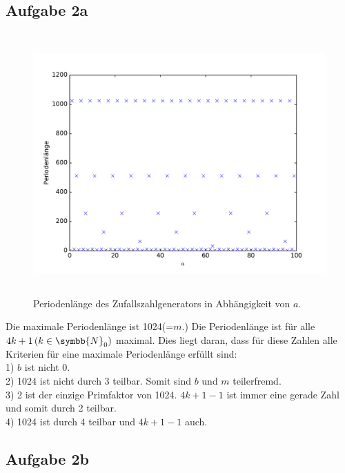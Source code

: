 \documentclass[
  bibliography=totoc,     %
  captions=tableheading,  %
  titlepage=firstiscover, %
]{scrartcl}
\begin{document}
\subsection{Aufgabe 2a}

\begin{figure}[H]
  \centering
  \includegraphics[height=10cm]{aPerioden.pdf}
  \caption{Periodenlänge des Zufallszahlgenerators in Abhängigkeit von $a$.}
  \label{fig:perioden}
\end{figure}

Die maximale Periodenlänge ist 1024(=$m.$) Die Periodenlänge ist für alle
$4k+1\,(k\in\symbb{N}_0)$ maximal. Dies liegt daran, dass für diese Zahlen
alle Kriterien für eine maximale Periodenlänge erfüllt sind:\\
1) $b$ ist nicht 0.\\
2) 1024 ist nicht durch 3 teilbar. Somit sind $b$ und $m$ teilerfremd.\\
3) 2 ist der einzige Primfaktor von 1024. $4k+1-1$ ist immer eine gerade
Zahl und somit durch 2 teilbar.\\
4) 1024 ist durch 4 teilbar und $4k+1-1$ auch.\\

\subsection{Aufgabe 2b}
\end{document}
